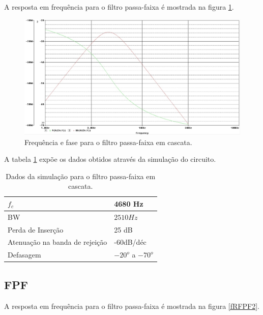 A resposta em frequência para o filtro passa-faixa é mostrada na figura \ref{fRFPF1}.

\begin{figure}[H]
 \centering
 \label{fRFPF1}
 \includegraphics[scale=0.5]{Imagens/rfpf1.jpg}
 \caption{Frequência e fase para o filtro passa-faixa em cascata.}
 \end{figure}
  
A tabela \ref{tFPF1} expõe os dados obtidos através da simulação do circuito.

\begin{small}
\begin{table}[H]
\begin{center}
\caption{Dados da simulação para o filtro passa-faixa em cascata.}

\begin{tabular}{l|l}
\hline
\hline
$f_c$ & 4680 Hz\\
\hline
BW & $2510 Hz$\\
\hline
Perda de Inserção & 25 dB\\
\hline
Atenuação na banda de rejeição & -60dB/déc \\
\hline
Defasagem & $-20^o$ a $-70^o$\\
\hline
\hline
\end{tabular}

\label{tFPF1}
\end{center}
\end{table}
\end{small}

\subsection{FPF}

A resposta em frequência para o filtro passa-faixa é mostrada na figura \ref{fRFPF2}.

